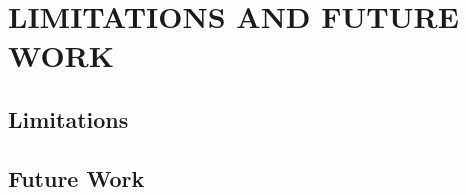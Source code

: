 \chapter{LIMITATIONS AND FUTURE WORK}
\label{chapter:limitations_and_future_work}

\section{Limitations}

\section{Future Work}